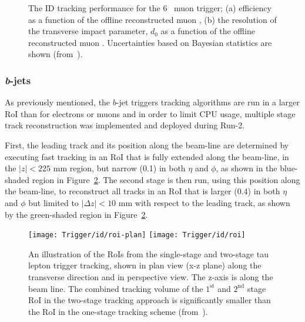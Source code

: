				\begin{figure}[!htb]
					\begin{center}
						\hspace{0.05\textwidth}
					\end{center}
					\caption{ 
					The ID tracking performance for the 6 \GeV\ muon trigger;
					(a) efficiency as a function of the offline reconstructed muon \pt,  
					(b) the resolution of the transverse impact parameter, $d_{0}$  as a function of the offline reconstructed muon \pt. Uncertainties based on Bayesian statistics are shown (from~\cite{ATLASTrigger2015}).}
					\label{fig:idmuontrigger}
				\end{figure}



			\subsubsection*{\emph{b}-jets}

				As previously mentioned, the $b$-jet triggers tracking algorithms are run in a larger \ac{RoI} than for electrons or muons and in order to limit \ac{CPU} usage, multiple stage track reconstruction was implemented and deployed during Run-2.

				First, the leading track and its position along the beam-line are determined by executing fast tracking in an \ac{RoI} that is fully extended along the beam-line, in the $|z|<225$ mm region, but narrow (0.1) in both $\eta$ and $\phi$, as shown in the blue-shaded region in Figure~\ref{fig:idroi}. The second stage is then run, using this position along the beam-line, to reconstruct all tracks in an \ac{RoI} that is larger (0.4) in both $\eta$ and $\phi$ but limited to $|\Delta z|<10$ mm with respect to the leading track, as shown by the green-shaded region in Figure~\ref{fig:idroi}.

				\begin{figure}[!htb]
					\centering
					\texttt{[image: Trigger/id/roi-plan]}
					\texttt{[image: Trigger/id/roi]}
					\caption{An illustration of the \ac{RoI}s from the single-stage and two-stage tau lepton trigger tracking, shown in plan view (x-z plane) along the transverse direction and in perspective view. The z-axis is along the beam line. The combined tracking volume of the $1^{\mathrm{st}}$ and $2^{\mathrm{nd}}$ stage \ac{RoI} in the two-stage tracking approach is significantly smaller than the \ac{RoI} in the one-stage tracking scheme (from~\cite{ATLASTrigger2015}).}
					\label{fig:idroi}
				\end{figure}

